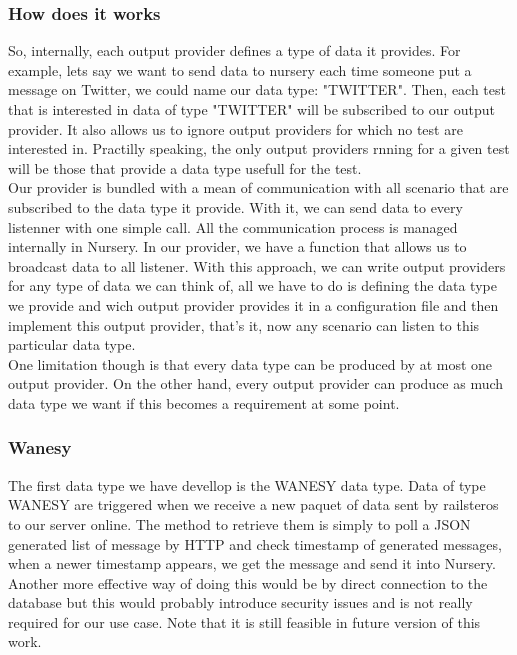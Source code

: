 \documentclass[12pt]{article}
\begin{document}
\subsubsection{How does it works}

So, internally, each output provider defines a type of data it provides. For example, lets say we want to send data to nursery each time someone put a message on Twitter, we could name our data type: "TWITTER". Then, each test that is interested in data of type "TWITTER" will be subscribed to our output provider. It also allows us to ignore output providers for which no test are interested in. Practilly speaking, the only output providers rnning for a given test will be those that provide a data type usefull for the test.\\

Our provider is bundled with a mean of communication with all scenario that are subscribed to the data type it provide. With it, we can send data to every listenner with one simple call. All the communication process is managed internally in Nursery.
In our provider, we have a function that allows us to broadcast data to all listener. With this approach, we can write output providers for any type of data we can think of, all we have to do is defining the data type we provide and wich output provider provides it in a configuration file and then implement this output provider, that's it, now any scenario can listen to this particular data type.\\

One limitation though is that every data type can be produced by at most one output provider. On the other hand, every output provider can produce as much data type we want if this becomes a requirement at some point.\\

\subsubsection{Wanesy}

The first data type we have devellop is the WANESY data type. Data of type WANESY are triggered when we receive a new paquet of data sent by \gls{railsteros} to our server online. The method to retrieve them is simply to poll a JSON generated list of message by HTTP and check timestamp of generated messages, when a newer timestamp appears, we get the message and send it into Nursery.\\

Another more effective way of doing this would be by direct connection to the database but this would probably introduce security issues and is not really required for our use case. Note that it is still feasible in future version of this work.
\end{document}
